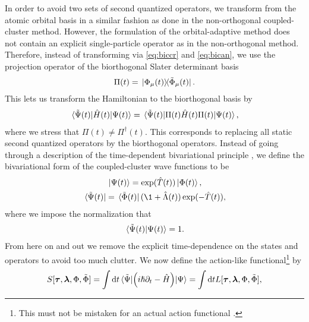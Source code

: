         In order to avoid two sets of second quantized operators, we
        transform from the atomic orbital basis in a similar fashion as done
        in the non-orthogonal coupled-cluster method.
        However, the formulation of the orbital-adaptive method does not
        contain an explicit single-particle operator as in the
        non-orthogonal method.
        Therefore, instead of transforming via \autoref{eq:biccr} and
        \autoref{eq:bican}, we use the projection operator of the
        biorthogonal Slater determinant basis \cite{kvaal2012ab}
        \begin{align}
            \Pi(t)
            = \dyad*{\slat_{\mu}(t)}{\tilde{\slat}_{\mu}(t)}.
        \end{align}
        This lets us transform the Hamiltonian to the biorthogonal basis by
        \begin{align}
            \mel*{\tilde{\Psi}(t)}{\hat{H}(t)}{\Psi(t)}
            =
            \mel*{\tilde{\Psi}(t)}{\Pi(t)\hat{H}(t)\Pi(t)}{\Psi(t)},
        \end{align}
        where we stress that $\Pi(t) \neq \Pi^{\dagger}(t)$.  This
        corresponds to replacing all static second quantized operators by
        the biorthogonal operators.
        Instead of going through a description of the time-dependent
        bivariational principle \cite{kvaal2012ab, arponen1983311}, we
        define the bivariational form of the coupled-cluster wave functions
        to be
        \begin{gather}
            \ket*{\Psi(t)} = \exponential(\clust(t))\ket*{\slat(t)}, \\
            \bra*{\tilde{\Psi}(t)}
            = \bra*{\tilde{\slat}(t)}(\1 + \clustl(t))
            \exponential(-\clust(t)),
        \end{gather}
        where we impose the normalization that
        \begin{align}
            \braket*{\tilde{\Psi}(t)}{\Psi(t)} = 1.
        \end{align}
        From here on and out we remove the explicit time-dependence on the
        states and operators to avoid too much clutter.
        We now define the action-like functional\footnote{%
            This must not be mistaken for an actual action functional
            \cite{arponen1983311}.
        } by \cite{kvaal2012ab, arponen1983311}
        \begin{align}
            S[\boldsymbol{\tau}, \boldsymbol{\lambda}, \Phi, \tilde{\Phi}]
            =
            \int \dd t
            \mel*{\tilde{\Psi}}{
                \left( 
                    i\hslash\partial_t - \hat{H}
                 \right)
            }{\Psi}
            =
            \int \dd t
            L[\boldsymbol{\tau}, \boldsymbol{\lambda}, \Phi, \tilde{\Phi}],
            \label{eq:oacc-action-functional}
        \end{align}
